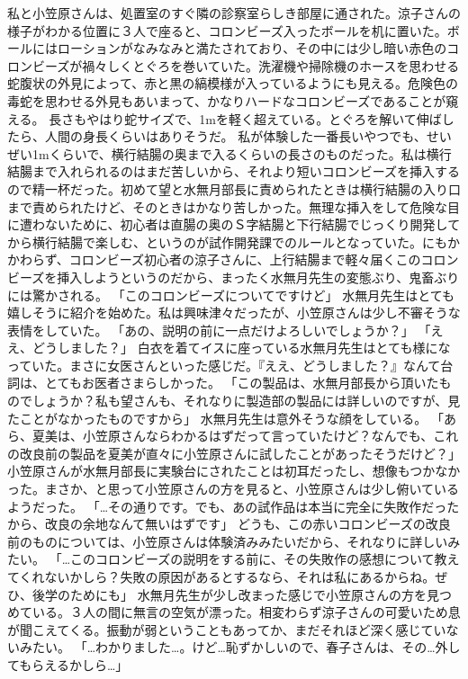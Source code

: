 私と小笠原さんは、処置室のすぐ隣の診察室らしき部屋に通された。涼子さんの様子がわかる位置に３人で座ると、コロンビーズ入ったボールを机に置いた。ボールにはローションがなみなみと満たされており、その中には少し暗い赤色のコロンビーズが禍々しくとぐろを巻いていた。洗濯機や掃除機のホースを思わせる蛇腹状の外見によって、赤と黒の縞模様が入っているようにも見える。危険色の毒蛇を思わせる外見もあいまって、かなりハードなコロンビーズであることが窺える。
長さもやはり蛇サイズで、1mを軽く超えている。とぐろを解いて伸ばしたら、人間の身長くらいはありそうだ。
私が体験した一番長いやつでも、せいぜい1mくらいで、横行結腸の奥まで入るくらいの長さのものだった。私は横行結腸まで入れられるのはまだ苦しいから、それより短いコロンビーズを挿入するので精一杯だった。初めて望と水無月部長に責められたときは横行結腸の入り口まで責められたけど、そのときはかなり苦しかった。無理な挿入をして危険な目に遭わないために、初心者は直腸の奥のＳ字結腸と下行結腸でじっくり開発してから横行結腸で楽しむ、というのが試作開発課でのルールとなっていた。にもかかわらず、コロンビーズ初心者の涼子さんに、上行結腸まで軽々届くこのコロンビーズを挿入しようというのだから、まったく水無月先生の変態ぶり、鬼畜ぶりには驚かされる。
「このコロンビーズについてですけど」
水無月先生はとても嬉しそうに紹介を始めた。私は興味津々だったが、小笠原さんは少し不審そうな表情をしていた。
「あの、説明の前に一点だけよろしいでしょうか？」
「ええ、どうしました？」
白衣を着てイスに座っている水無月先生はとても様になっていた。まさに女医さんといった感じだ。『ええ、どうしました？』なんて台詞は、とてもお医者さまらしかった。
「この製品は、水無月部長から頂いたものでしょうか？私も望さんも、それなりに製造部の製品には詳しいのですが、見たことがなかったものですから」
水無月先生は意外そうな顔をしている。
「あら、夏美は、小笠原さんならわかるはずだって言っていたけど？なんでも、これの改良前の製品を夏美が直々に小笠原さんに試したことがあったそうだけど？」
小笠原さんが水無月部長に実験台にされたことは初耳だったし、想像もつかなかった。まさか、と思って小笠原さんの方を見ると、小笠原さんは少し俯いているようだった。
「…その通りです。でも、あの試作品は本当に完全に失敗作だったから、改良の余地なんて無いはずです」
どうも、この赤いコロンビーズの改良前のものについては、小笠原さんは体験済みみたいだから、それなりに詳しいみたい。
「…このコロンビーズの説明をする前に、その失敗作の感想について教えてくれないかしら？失敗の原因があるとするなら、それは私にあるからね。ぜひ、後学のためにも」
水無月先生が少し改まった感じで小笠原さんの方を見つめている。３人の間に無言の空気が漂った。相変わらず涼子さんの可愛いため息が聞こえてくる。振動が弱ということもあってか、まだそれほど深く感じていないみたい。
「…わかりました…。けど…恥ずかしいので、春子さんは、その…外してもらえるかしら…」
